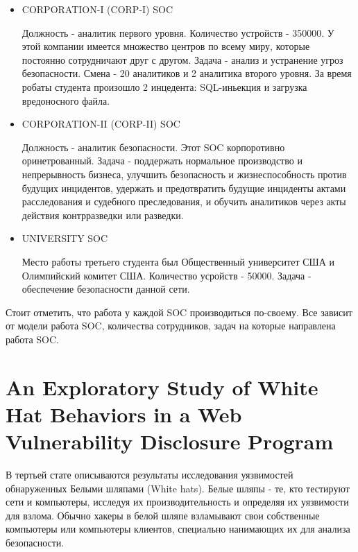 \documentclass[11pt, a4paper]{article}		%
\begin{document}
\begin{itemize}

\item CORPORATION-I (CORP-I) SOC

Должность - аналитик первого уровня. Количество устройств - 350000. У этой компании имеется множество центров по всему миру, которые постоянно сотрудничают друг с другом. Задача - анализ и устранение угроз безопасности. Смена - 20 аналитиков и 2 аналитика второго уровня. За время робаты студента произошло 2 инцедента: SQL-иньекция и загрузка вредоносного файла.

\item CORPORATION-II (CORP-II) SOC

Должность - аналитик безопасности. Этот SOC корпоротивно оринетрованный. Задача - поддержать нормальное производство и непрерывность бизнеса, улучшить безопасность и жизнеспособность против будущих инцидентов, удержать и предотвратить будущие инциденты актами расследования и судебного преследования, и обучить аналитиков через акты действия контрразведки или разведки.


\item UNIVERSITY SOC

Место работы третьего студента был Общественный университет США и Олимпийский комитет США. Количество усройств - 50000. Задача - обеспечение безопасности данной сети. 

\end{itemize}

Стоит отметить, что работа у каждой SOC производиться по-своему. Все зависит от модели работа SOC, количества сотрудников, задач на которые направлена работа SOC.




\section{An Exploratory Study of White Hat Behaviors in a Web Vulnerability Disclosure Program}

В тертьей стате описываются результаты исследования уязвимостей обнаруженных Белыми шляпами (White hats). Белые шляпы - те, кто тестируют сети и компьютеры, исследуя их производительность и определяя их уязвимости для взлома. Обычно хакеры в белой шляпе взламывают свои собственные компьютеры или компьютеры клиентов, специально нанимающих их для анализа безопасности.
\end{document}
